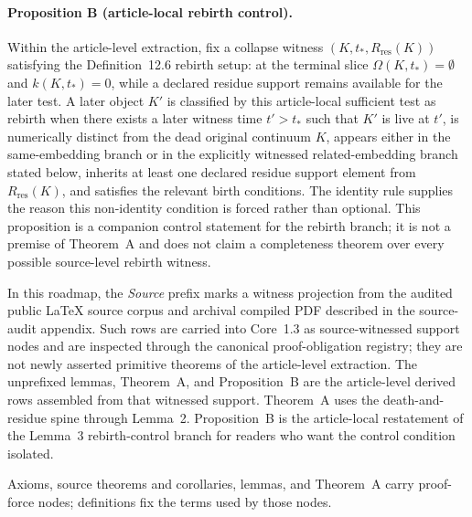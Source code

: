 \paragraph{Proposition B (article-local rebirth control).}
\label{prop:oc13-rebirth-control}
Within the article-level extraction, fix a collapse witness
\((K,t_\ast,R_{\mathrm{res}}(K))\) satisfying the Definition~12.6 rebirth
setup: at the terminal slice \(\Omega(K,t_\ast)=\emptyset\) and
\(k(K,t_\ast)=0\), while a declared residue support remains available for the
later test. A later object \(K'\) is classified by this article-local
sufficient test as rebirth when there exists a later witness time
\(t'>t_\ast\) such that \(K'\) is live at \(t'\), is numerically distinct from
the dead original continuum \(K\), appears either in the same-embedding branch
or in the explicitly witnessed related-embedding branch stated below, inherits
at least one declared residue support element from \(R_{\mathrm{res}}(K)\), and
satisfies the relevant birth conditions. The identity rule supplies the reason
this non-identity condition is forced rather than optional.
This proposition is a companion control statement for the rebirth branch; it is
not a premise of Theorem~A and does not claim a completeness theorem over every
possible source-level rebirth witness.

In this roadmap, the \emph{Source} prefix marks a witness projection from the
audited public LaTeX source corpus and archival compiled PDF described in the
source-audit appendix. Such rows are carried into Core~1.3 as source-witnessed
support nodes and are inspected through the canonical proof-obligation
registry; they are not newly asserted primitive theorems of the article-level
extraction. The unprefixed lemmas, Theorem~A, and Proposition~B are the
article-level derived rows assembled from that witnessed support. Theorem~A
uses the death-and-residue spine through Lemma~2. Proposition~B is the
article-local restatement of the Lemma~3 rebirth-control branch for readers who
want the control condition isolated.

Axioms, source theorems and corollaries, lemmas, and Theorem~A carry
proof-force nodes; definitions fix the terms used by those nodes.

